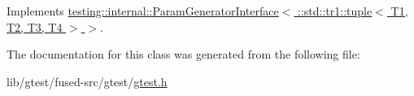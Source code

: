 Implements \hyperlink{classtesting_1_1internal_1_1_param_generator_interface_ae82e6fc79efcef1c794ad333ffb5bf80}{testing\-::internal\-::\-Param\-Generator\-Interface$<$ \-::std\-::tr1\-::tuple$<$ T1, T2, T3, T4 $>$ $>$}.



The documentation for this class was generated from the following file\-:\begin{DoxyCompactItemize}
\item 
lib/gtest/fused-\/src/gtest/\hyperlink{fused-src_2gtest_2gtest_8h}{gtest.\-h}\end{DoxyCompactItemize}

